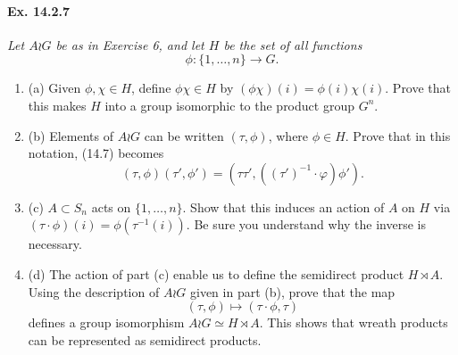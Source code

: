 \documentclass[11pt,a4paper]{article}
\newcommand{\be} {\begin{enumerate}}
\newcommand{\ee} {\end{enumerate}}
\begin{document}
\paragraph{Ex. 14.2.7}
{\it Let $A \wr G$ be as in Exercise 6, and let $H$ be the set of all functions
$$\phi:\{1,\ldots,n\} \to G.$$
\be
\item[(a)] Given $\phi,\chi \in H$, define $\phi \chi \in H$ by $(\phi \chi)(i) = \phi(i)\chi(i)$. Prove that this makes $H$ into a group isomorphic to the product group $G^n$.
\item[(b)] Elements of $A \wr G$ can be written $(\tau,\phi)$, where $\phi \in H$. Prove that in this notation, (14.7) becomes
$$(\tau,\phi)(\tau',\phi') = (\tau \tau',((\tau')^{-1} \cdot \varphi) \phi').$$
\item[(c)] $A \subset S_n$ acts on $\{1,\ldots,n\}$. Show that this induces an action of $A$ on $H$ via $(\tau\cdot \phi)(i) = \phi(\tau^{-1}(i))$. Be sure you understand why the inverse is necessary.
\item[(d)] The action of part (c) enable us to define the semidirect product $H \rtimes A$. Using the description of $A \wr G$ given in part (b), prove that the map
$$(\tau, \phi) \mapsto (\tau \cdot \phi, \tau)$$
defines a group isomorphism $A \wr G \simeq H \rtimes A$. This shows that wreath products can be represented as semidirect products.

\ee
}
\end{document}
